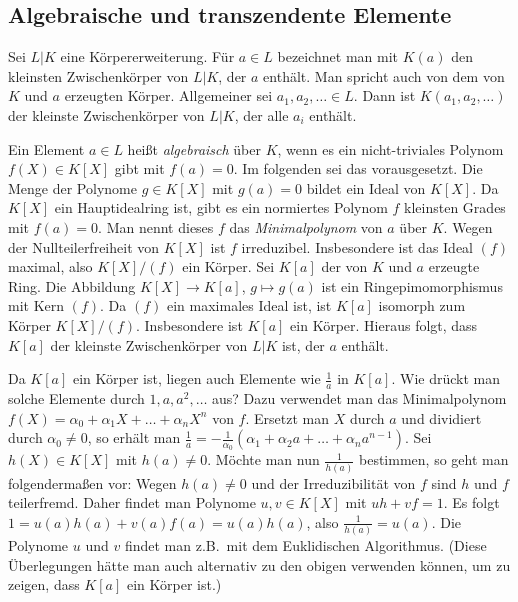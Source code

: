 \documentclass[12pt,a4paper,twoside]{article}
\newcommand{\ei}[1]{\emph{#1}\index{#1}}
\begin{document}
\subsection{Algebraische und transzendente Elemente}
Sei $L|K$ eine K\"orpererweiterung. F\"ur $a\in L$ bezeichnet man mit $K(a)$
den kleinsten Zwischenk\"orper von $L|K$, der $a$ enth\"alt. Man spricht auch
von dem von $K$ und $a$ erzeugten K\"orper. Allgemeiner sei $a_1,a_2,\dots\in
L$. Dann ist $K(a_1,a_2,\dots)$ der kleinste Zwischenk\"orper von $L|K$, der
alle $a_i$ enth\"alt.

Ein Element $a\in L$ hei\ss t \ei{algebraisch} \"uber $K$, wenn es ein
nicht-triviales Polynom $f(X)\in K[X]$ gibt mit $f(a)=0$. Im folgenden sei das
vorausgesetzt. Die Menge der Polynome $g\in K[X]$ mit $g(a)=0$ bildet ein
Ideal von $K[X]$. Da $K[X]$ ein Hauptidealring ist, gibt es ein normiertes
Polynom $f$ kleinsten Grades mit $f(a)=0$. Man nennt dieses $f$ das
\ei{Minimalpolynom} von $a$ \"uber $K$.  Wegen der Nullteilerfreiheit von
$K[X]$ ist $f$ irreduzibel. Insbesondere ist das Ideal $(f)$ maximal, also
$K[X]/(f)$ ein K\"orper. Sei $K[a]$ der von $K$ und $a$ erzeugte Ring. Die
Abbildung $K[X]\to K[a]$, $g\mapsto g(a)$ ist ein Ringepimomorphismus mit Kern
$(f)$. Da $(f)$ ein maximales Ideal ist, ist $K[a]$ isomorph zum K\"orper
$K[X]/(f)$. Insbesondere ist $K[a]$ ein K\"orper.  Hieraus folgt, dass $K[a]$
der kleinste Zwischenk\"orper von $L|K$ ist, der $a$ enth\"alt.

Da $K[a]$ ein K\"orper ist, liegen auch Elemente wie $\frac{1}{a}$ in $K[a]$.
Wie dr\"uckt man solche Elemente durch $1,a,a^2,\dots$ aus? Dazu verwendet man
das Minimalpolynom $f(X)=\alpha_0+\alpha_1X+\dots+\alpha_nX^n$ von $f$.
Ersetzt man $X$ durch $a$ und dividiert durch $\alpha_0\ne0$, so erh\"alt man
$\frac{1}{a}=-\frac{1}{\alpha_0}(\alpha_1+\alpha_2a+\dots+\alpha_{n}a^{n-1})$.
Sei $h(X)\in K[X]$ mit $h(a)\ne0$. M\"ochte man nun $\frac{1}{h(a)}$
bestimmen, so geht man folgenderma\ss en vor: Wegen $h(a)\ne0$ und der
Irreduzibilit\"at von $f$ sind $h$ und $f$ teilerfremd. Daher findet man
Polynome $u,v\in K[X]$ mit $uh+vf=1$. Es folgt $1=u(a)h(a)+v(a)f(a)=u(a)h(a)$,
also $\frac{1}{h(a)}=u(a)$. Die Polynome $u$ und $v$ findet man z.B.\ mit dem
Euklidischen Algorithmus. (Diese \"Uberlegungen h\"atte man auch alternativ zu
den obigen verwenden k\"onnen, um zu zeigen, dass $K[a]$ ein K\"orper ist.)
\end{document}
